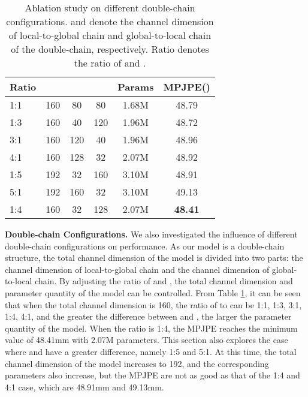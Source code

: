 \documentclass[journal]{IEEEtran}
\begin{document}
\begin{table}[ht]
  \renewcommand{\arraystretch}{1.2}
\caption{Ablation study on different double-chain configurations.  and  denote the channel dimension of local-to-global chain and global-to-local chain of the double-chain, respectively. Ratio denotes the ratio of  and .}\label{table:channel}
\centering \begin{tabular}{l|c|cc|c|c}
\toprule Ratio  & & &   &Params &MPJPE()\\
\hline
1:1   &160  &80   &80        &1.68M   &48.79 \\
1:3   &160  &40   &120       &1.96M   &48.72\\
3:1   &160  &120  &40     &1.96M   &48.96 \\
4:1   &160  &128  &32     &2.07M   &48.92 \\
1:5   &192 &32   &160    &3.10M &48.91 \\
5:1   &192 &160   &32    &3.10M &49.13 \\
\hline
1:4   &160 &32   &128    &2.07M &\bf{48.41} \\
\bottomrule 

\end{tabular}
\end{table}


{\bf{Double-chain Configurations.}} We also investigated the influence of different double-chain configurations on performance. As our model is a double-chain structure, the total channel dimension of the model is divided into two parts: the channel dimension of local-to-global chain and the channel dimension of global-to-local chain. By adjusting the ratio of  and , the total channel dimension and parameter quantity of the model can be controlled. From Table \ref{table:channel}, it can be seen that when the total channel dimension is 160, the ratio of  to  can be 1:1, 1:3, 3:1, 1:4, 4:1, and the greater the difference between  and , the larger the parameter quantity of the model. When the ratio is 1:4, the MPJPE reaches the minimum value of 48.41mm with 2.07M parameters. This section also explores the case where  and  have a greater difference, namely 1:5 and 5:1. At this time, the total channel dimension of the model increases to 192, and the corresponding parameters also increase, but the MPJPE are not as good as that of the 1:4 and 4:1 case, which are 48.91mm and 49.13mm. 
\end{document}
